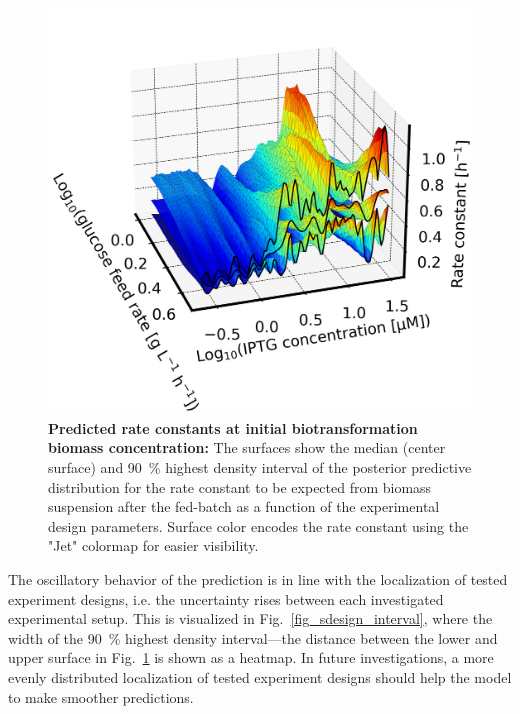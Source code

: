 \documentclass[sn-standardnature]{sn-jnl}%
\theoremstyle{thmstyleone}%
\theoremstyle{thmstyletwo}%
\theoremstyle{thmstylethree}%
\begin{document}
\begin{figure}[H]
    \centering
    \includegraphics[width=1.0\textwidth]{figures/plot_3d_pp_dense_k_design.png}
    \caption{
        \textbf{Predicted rate constants at initial biotransformation biomass concentration:}
        The surfaces show the median (center surface) and 90~\% highest density interval of the posterior predictive distribution for the rate constant to be expected from biomass suspension after the fed-batch as a function of the experimental design parameters.
        Surface color encodes the rate constant using the "Jet" colormap \cite{matplotlibDocs} for easier visibility.
    }
    \label{fig_3Dkdesign}
\end{figure}

The oscillatory behavior of the prediction is in line with the localization of tested experiment designs, i.e. the uncertainty rises between each investigated experimental setup.
This is visualized in Fig.~\ref{fig_sdesign_interval}, where the width of the 90~\% highest density interval---the distance between the lower and upper surface in Fig.~\ref{fig_3Dkdesign} is shown as a heatmap.
In future investigations, a more evenly distributed localization of tested experiment designs should help the model to make smoother predictions.
\end{document}
